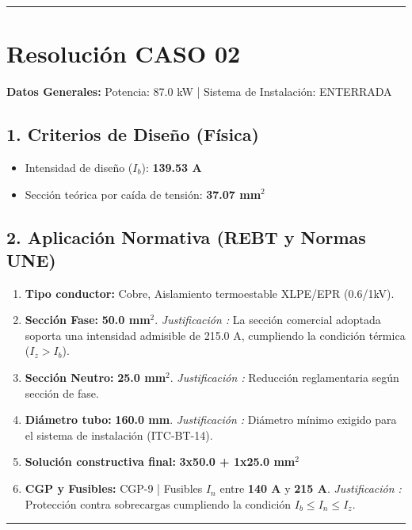 \documentclass{article}
\begin{document}
\vspace{1cm}
\hrule
\vspace{1cm}
\section*{Resolución CASO 02}
\textbf{Datos Generales:} Potencia: 87.0 kW | Sistema de Instalación: ENTERRADA

\subsection*{1. Criterios de Diseño (Física)}
\begin{itemize}
    \item Intensidad de diseño ($I_b$): \textbf{139.53 A}
    \item Sección teórica por caída de tensión: \textbf{37.07 mm$^2$}
\end{itemize}

\subsection*{2. Aplicación Normativa (REBT y Normas UNE)}
\begin{enumerate}
    \item \textbf{Tipo conductor:} Cobre, Aislamiento termoestable XLPE/EPR (0.6/1kV).
    \item \textbf{Sección Fase:} \textbf{50.0 mm$^2$}. \textit{Justificación \cite{une_hd_60364_5_52}:} La sección comercial adoptada soporta una intensidad admisible de 215.0 A, cumpliendo la condición térmica ($I_z > I_b$).
    \item \textbf{Sección Neutro:} \textbf{25.0 mm$^2$}. \textit{Justificación \cite{guia_bt_14}:} Reducción reglamentaria según sección de fase.
    \item \textbf{Diámetro tubo:} \textbf{160.0 mm}. \textit{Justificación \cite{rebt_rd842}:} Diámetro mínimo exigido para el sistema de instalación (ITC-BT-14).
    \item \textbf{Solución constructiva final:} \textbf{3x50.0 + 1x25.0 mm$^2$}
    \item \textbf{CGP y Fusibles:} CGP-9 | Fusibles $I_n$ entre \textbf{140 A} y \textbf{215 A}. \textit{Justificación \cite{rebt_rd842}:} Protección contra sobrecargas cumpliendo la condición $I_b \leq I_n \leq I_z$.
\end{enumerate}

\vspace{1cm}
\hrule
\vspace{1cm}
\end{document}
